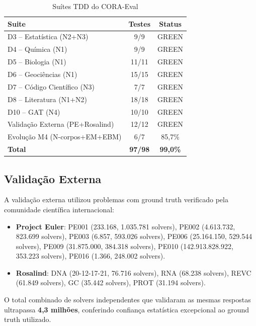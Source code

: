 \documentclass[12pt,a4paper]{article}
\begin{document}
\begin{table}[H]
\centering
\caption{Suítes TDD do CORA-Eval}
\label{tab:tdd}
\begin{tabular}{lcc}
\toprule
\textbf{Suite} & \textbf{Testes} & \textbf{Status} \\
\midrule
D3 -- Estatística (N2+N3)          &  9/9   & GREEN \\
D4 -- Química (N1)                 &  9/9   & GREEN \\
D5 -- Biologia (N1)                & 11/11  & GREEN \\
D6 -- Geociências (N1)             & 15/15  & GREEN \\
D7 -- Código Científico (N3)       &  7/7   & GREEN \\
D8 -- Literatura (N1+N2)           & 18/18  & GREEN \\
D10 -- GAT (N4)                    & 10/10  & GREEN \\
Validação Externa (PE+Rosalind)    & 12/12  & GREEN \\
Evolução M4 (N-corpos+EM+EBM)      &  6/7   & 85,7\% \\
\midrule
\textbf{Total}                     & \textbf{97/98} & \textbf{99,0\%} \\
\bottomrule
\end{tabular}
\end{table}

\subsection{Validação Externa}

A validação externa utilizou problemas com ground truth verificado pela
comunidade científica internacional:

\begin{itemize}
\item \textbf{Project Euler}: PE001 (233.168, 1.035.781 solvers), PE002 (4.613.732,
      823.699 solvers), PE003 (6.857, 593.026 solvers), PE006 (25.164.150,
      529.544 solvers), PE009 (31.875.000, 384.318 solvers), PE010
      (142.913.828.922, 353.223 solvers), PE016 (1.366, 248.002 solvers).
\item \textbf{Rosalind}: DNA (20-12-17-21, 76.716 solvers), RNA (68.238 solvers),
      REVC (61.849 solvers), GC (35.442 solvers), PROT (31.194 solvers).
\end{itemize}

O total combinado de solvers independentes que validaram as mesmas respostas
ultrapassa \textbf{4,3 milhões}, conferindo confiança estatística excepcional
ao ground truth utilizado.
\end{document}
